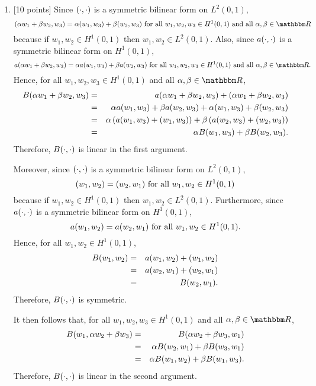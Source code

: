 \begin{solution}
\begin{enumerate}
\item {[10 points]} Since $(\cdot,\cdot)$ is a symmetric bilinear form on $L^2(0,1)$,
\[
\ip{\alpha w_1+\beta w_2,w_3}=\alpha\ip{w_1,w_3}+\beta\ip{w_2,w_3}\mbox{ for all }w_1,w_2,w_3\in H^1(0,1)\mbox{ and all }\alpha,\beta\in\R
\]
because if $w_1,w_2\in H^1(0,1)$ then $w_1,w_2\in L^2(0,1)$. Also, since $a(\cdot,\cdot)$ is a symmetric bilinear form on $H^1(0,1)$,
\[
a\ip{\alpha w_1+\beta w_2,w_3}=\alpha a\ip{w_1,w_3}+\beta a\ip{w_2,w_3}\mbox{ for all }w_1,w_2,w_3\in H^1(0,1)\mbox{ and all }\alpha,\beta\in\R.
\]
Hence, for all $w_1,w_2,w_3\in H^1(0,1)$ and all $\alpha,\beta\in\R$,
\begin{eqnarray*}
B(\alpha w_1+\beta w_2,w_3)&=&a(\alpha w_1+\beta w_2,w_3)+(\alpha w_1+\beta w_2,w_3)
\\
&=&\alpha a(w_1,w_3)+\beta a(w_2,w_3)+\alpha (w_1,w_3)+\beta (w_2,w_3)
\\
&=&\alpha\left(a(w_1,w_3)+(w_1,w_3)\right)+\beta\left(a(w_2,w_3)+(w_2,w_3)\right)
\\
&=&\alpha B(w_1,w_3)+\beta B(w_2,w_3).
\end{eqnarray*}
Therefore, $B(\cdot,\cdot)$ is linear in the first argument.

Moreover, since $(\cdot,\cdot)$ is a symmetric bilinear form on $L^2(0,1)$,
\[
(w_1,w_2)=(w_2,w_1)\mbox{ for all }w_1,w_2\in H^1(0,1)
\]
because if $w_1,w_2\in H^1(0,1)$ then $w_1,w_2\in L^2(0,1)$. Furthermore, since $a(\cdot,\cdot)$ is a symmetric bilinear form on $H^1(0,1)$,
\[
a(w_1,w_2)=a(w_2,w_1)\mbox{ for all }w_1,w_2\in H^1(0,1).
\]
Hence, for all $w_1,w_2\in H^1(0,1)$,
\begin{eqnarray*}
B(w_1,w_2)&=&a(w_1,w_2)+(w_1,w_2)
\\
&=&a(w_2,w_1)+(w_2,w_1)
\\
&=&B(w_2,w_1).
\end{eqnarray*}
Therefore, $B(\cdot,\cdot)$ is symmetric.

It then follows that, for all $w_1,w_2,w_3\in H^1(0,1)$ and all $\alpha,\beta\in\R$,
\begin{eqnarray*}
B(w_1,\alpha w_2+\beta w_3)&=&B(\alpha w_2+\beta w_3,w_1)
\\
&=&\alpha B(w_2,w_1)+\beta B(w_3,w_1)
\\
&=&\alpha B(w_1,w_2)+\beta B(w_1,w_3).
\end{eqnarray*}
Therefore, $B(\cdot,\cdot)$ is linear in the second argument.


\end{enumerate}
\end{solution}
